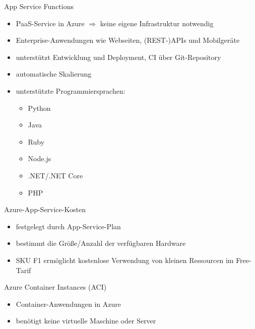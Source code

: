 \begin{flashcard}[Definition]{App Service Functions}
    \begin{itemize}
        \item PaaS-Service in Azure\newline
        $\Rightarrow$ keine eigene Infrastruktur notwendig
        \item Enterprise-Anwendungen wie Webseiten, (REST-)APIs und Mobilgeräte
        \item unterstützt Entwicklung und Deployment, CI über Git-Repository
        \item automatische Skalierung
        \item unterstützte Programmiersprachen:
        \begin{itemize}
            \item Python
            \item Java
            \item Ruby
            \item Node.js
            \item .NET/.NET Core
            \item PHP
        \end{itemize}
    \end{itemize}
\end{flashcard}

\begin{flashcard}[\ ]{Azure-App-Service-Kosten}
    \begin{itemize}
        \item festgelegt durch App-Service-Plan
        \item bestimmt die Größe/Anzahl der verfügbaren Hardware
        \item SKU F1 ermöglicht kostenlose Verwendung von kleinen Ressourcen im Free-Tarif
    \end{itemize}

\end{flashcard}

\begin{flashcard}[Definition]{Azure Container Instances (ACI)}
    \begin{itemize}
        \item Container-Anwendungen in Azure
        \item benötigt keine virtuelle Maschine oder Server
    \end{itemize}

\end{flashcard}

